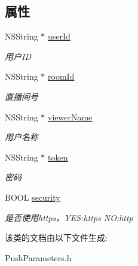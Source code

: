 \subsection*{属性}
\begin{DoxyCompactItemize}
\item 
\mbox{\label{interface_push_parameters_a722b1e94179f3d816ef369d29bf28fe6}} 
N\+S\+String $\ast$ \hyperlink{interface_push_parameters_a722b1e94179f3d816ef369d29bf28fe6}{user\+Id}
\begin{DoxyCompactList}\small\item\em 用户\+ID \end{DoxyCompactList}\item 
\mbox{\label{interface_push_parameters_a33af8d25a2f144afca8e77ffb9e31082}} 
N\+S\+String $\ast$ \hyperlink{interface_push_parameters_a33af8d25a2f144afca8e77ffb9e31082}{room\+Id}
\begin{DoxyCompactList}\small\item\em 直播间号 \end{DoxyCompactList}\item 
\mbox{\label{interface_push_parameters_a1d607c97abf94d67a0e413df87422a2d}} 
N\+S\+String $\ast$ \hyperlink{interface_push_parameters_a1d607c97abf94d67a0e413df87422a2d}{viewer\+Name}
\begin{DoxyCompactList}\small\item\em 用户名称 \end{DoxyCompactList}\item 
\mbox{\label{interface_push_parameters_a4a6e4b2ad16ee88c4555a8541d085864}} 
N\+S\+String $\ast$ \hyperlink{interface_push_parameters_a4a6e4b2ad16ee88c4555a8541d085864}{token}
\begin{DoxyCompactList}\small\item\em 密码 \end{DoxyCompactList}\item 
\mbox{\label{interface_push_parameters_ab12c8665dcbc45b0c369a21b3992a191}} 
B\+O\+OL \hyperlink{interface_push_parameters_ab12c8665dcbc45b0c369a21b3992a191}{security}
\begin{DoxyCompactList}\small\item\em 是否使用https，\+Y\+ES\+:https NO\+:http \end{DoxyCompactList}\end{DoxyCompactItemize}


该类的文档由以下文件生成\+:\begin{DoxyCompactItemize}
\item 
Push\+Parameters.\+h\end{DoxyCompactItemize}
